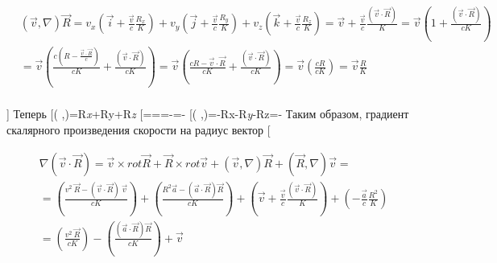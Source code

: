 \documentclass[11pt]{article}
\begin{document}
\begin{align}
  & \left( \overrightarrow{v},\nabla  \right)\overrightarrow{R}={{v}_{x}}\left( \overrightarrow{i}+\frac{\overrightarrow{v}}{c}\frac{{{R}_{x}}}{K} \right)+{{v}_{y}}\left( \overrightarrow{j}+\frac{\overrightarrow{v}}{c}\frac{{{R}_{y}}}{K} \right)+{{v}_{z}}\left( \overrightarrow{k}+\frac{\overrightarrow{v}}{c}\frac{{{R}_{z}}}{K} \right)=\overrightarrow{v}+\frac{\overrightarrow{v}}{c}\frac{\left( \overrightarrow{v}\cdot \overrightarrow{R} \right)}{K}=\overrightarrow{v}\left( 1+\frac{\left( \overrightarrow{v}\cdot \overrightarrow{R} \right)}{cK} \right) \\ 
 & =\overrightarrow{v}\left( \frac{c\left( R-\frac{\overrightarrow{v}\cdot \overrightarrow{R}}{c} \right)}{cK}+\frac{\left( \overrightarrow{v}\cdot \overrightarrow{R} \right)}{cK} \right)=\overrightarrow{v}\left( \frac{cR-\overrightarrow{v}\cdot \overrightarrow{R}}{cK}+\frac{\left( \overrightarrow{v}\cdot \overrightarrow{R} \right)}{cK} \right)=\overrightarrow{v}\left( \frac{cR}{cK} \right)=\overrightarrow{v}\frac{R}{K} \\ 
\end{align}

{]} Теперь {[}\left(
,\nabla  \right)={{R}\emph{{x}}+{{R}}{y}}+{{R}\emph{{z}}\overrightarrow{v}{]}
{[}===-=-\frac{{{R}_{x}}}{K}{]}
{[}\left(
,\nabla  \right)=-{{R}}{x}}-{{R}\emph{{y}}-{{R}}{z}}=-\frac{{{R}^{2}}}{K}{]}
Таким образом, градиент скалярного произведения скорости на радиус
вектор {[}

\begin{align}
  & \nabla \left( \overrightarrow{v}\cdot \overrightarrow{R} \right)=\overrightarrow{v}\times rot\overrightarrow{R}+\overrightarrow{R}\times rot\overrightarrow{v}+\left( \overrightarrow{v},\nabla  \right)\overrightarrow{R}+\left( \overrightarrow{R},\nabla  \right)\overrightarrow{v}= \\ 
 & =\left( \frac{{{v}^{2}}\ \overrightarrow{R}-\left( \overrightarrow{v}\cdot \overrightarrow{R} \right)\ \overrightarrow{v}}{cK} \right)+\left( \frac{{{R}^{2}}\overrightarrow{a}-\left( \overrightarrow{a}\cdot \overrightarrow{R} \right)\overrightarrow{R}}{cK} \right)+\left( \overrightarrow{v}+\frac{\overrightarrow{v}}{c}\frac{\left( \overrightarrow{v}\cdot \overrightarrow{R} \right)}{K} \right)+\left( -\frac{\overrightarrow{a}}{c}\frac{{{R}^{2}}}{K} \right) \\ 
 & =\left( \frac{{{v}^{2}}\ \overrightarrow{R}}{cK} \right)-\left( \frac{\left( \overrightarrow{a}\cdot \overrightarrow{R} \right)\overrightarrow{R}}{cK} \right)+\overrightarrow{v} \\ 
\end{align}
\end{document}
